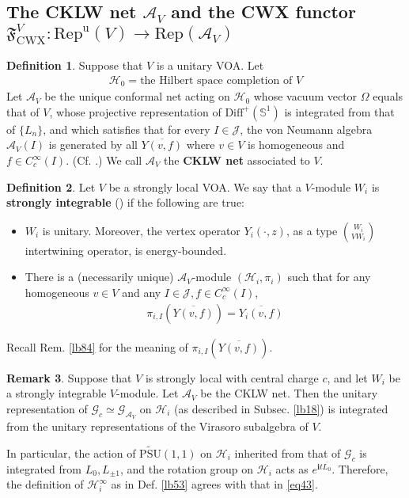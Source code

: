 \documentclass[11pt,b5paper,notitlepage]{article}
\theoremstyle{definition}
\newtheorem{df}{Definition}[section]
\newtheorem{rem}[df]{Remark}
\theoremstyle{plain}
\newcommand{\fk}{\mathfrak}
\newcommand{\mc}{\mathcal}
\newcommand{\ovl}{\overline}
\newcommand{\Rep}{\mathrm{Rep}}
\newcommand{\uni}{\mathrm{u}}
\newcommand{\Diffp}{\mathrm{Diff}^+}
\newcommand{\scr}{\mathscr}
\newcommand{\im}{\mathbf{i}}
\newcommand{\RepV}{{\mathrm{Rep}^\uni(V)}}
\newcommand{\UPSU}{\widetilde{\mathrm{PSU}}(1,1)}
\newcommand{\Sbb}{{\mathbb S}}
\newcommand{\Gc}{\mathscr G_c}
\newcommand{\CWX}{{\scriptscriptstyle \mathrm{CWX}}}
\numberwithin{equation}{section}
\begin{document}
\subsection{The CKLW net $\mc A_V$ and the CWX functor $\fk F^V_\CWX:\RepV\rightarrow\Rep(\mc A_V)$}



\begin{df}
Suppose that $V$ is a unitary VOA. Let
\begin{align*}
\mc H_0=\text{the Hilbert space completion of $V$}
\end{align*}
Let $\mc A_V$ be the unique conformal net acting on $\mc H_0$ whose vacuum vector $\Omega$ equals that of $V$, whose projective representation of $\Diffp(\Sbb^1)$ is integrated from that of $\{L_n\}$, and which satisfies that for every $I\in\mc J$, the von Neumann algebra $\mc A_V(I)$ is generated by all $\ovl{Y(v,f)}$ where $v\in V$ is homogeneous and $f\in C_c^\infty(I)$. (Cf. \cite{CKLW18}.) We call $\mc A_V$ the \textbf{CKLW net} associated to $V$. 
\end{df}



\begin{df}\label{lb37}
Let $V$ be a strongly local VOA. We say that a $V$-module $W_i$ is \textbf{strongly integrable} (\cite{CWX}) if the following are true:
\begin{itemize}
\item $W_i$ is unitary. Moreover, the vertex operator $Y_i(\cdot,z)$, as a type $W_i\choose V W_i$ intertwining operator, is energy-bounded.
\item There is a (necessarily unique) $\mc A_V$-module $(\mc H_i,\pi_i)$ such that for any homogeneous $v\in V$ and any $I\in\mc J,f\in C_c^\infty(I)$,
\begin{align}
\pi_{i,I}(\ovl{Y(v,f)})=\ovl{Y_i(v,f)}\label{eq31}
\end{align}
\end{itemize}
\end{df}
Recall Rem. \ref{lb84} for the meaning of $\pi_{i,I}(\ovl{Y(v,f)})$.

\begin{rem}\label{lb52}
Suppose that $V$ is strongly local with central charge $c$, and let $W_i$ be a strongly integrable $V$-module. Let $\mc A_V$ be the CKLW net. Then the unitary representation of $\Gc\simeq\scr G_{\mc A_V}$ on $\mc H_i$ (as described in Subsec. \ref{lb18}) is integrated from the unitary representations of the Virasoro subalgebra of $V$.  

In particular, the action of $\UPSU$ on $\mc H_i$ inherited from that of $\scr G_c$ is integrated from $L_0,L_{\pm1}$, and the rotation group on $\mc H_i$ acts as $e^{\im t\ovl{L_0}}$. Therefore, the definition of $\mc H_i^\infty$ as in Def. \ref{lb53} agrees with that in \eqref{eq43}.
\end{rem}
\end{document}

